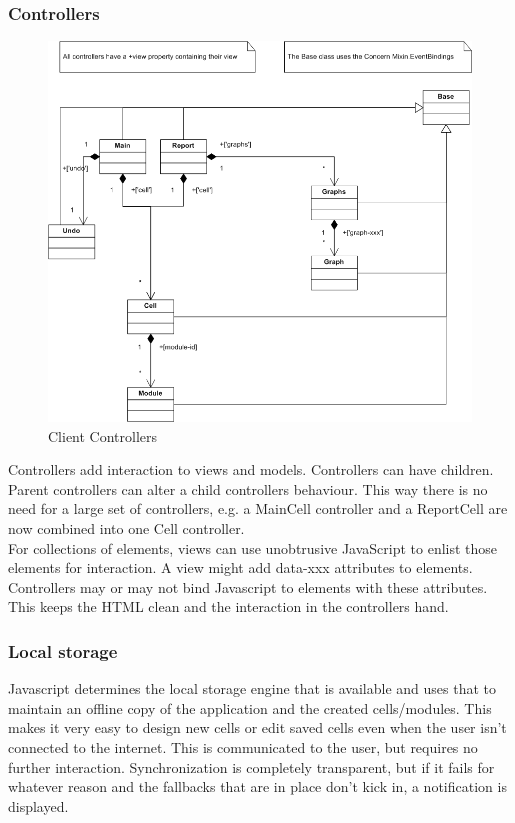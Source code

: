 \documentclass{report}
\begin{document}
				\subsubsection{Controllers}
					\begin{figure}[htb]
						\begin{center}
							\includegraphics[width=\linewidth]{controllers.png}
							\caption{Client Controllers}
							\label{fig: cmodels}
						\end{center}
					\end{figure}	
					Controllers add interaction to views and models. Controllers can have children. Parent controllers can alter a child controllers behaviour. This way there is no need for a large set of controllers, e.g. a MainCell controller and a ReportCell are now combined into one Cell controller. \\
					For collections of elements, views can use unobtrusive JavaScript to enlist those elements for interaction. A view might add data-xxx attributes to elements. Controllers may or may not bind Javascript to elements with these attributes. This keeps the HTML clean and the interaction in the controllers hand. 
					
				\subsubsection{Local storage}
					Javascript determines the local storage engine that is available and uses that to maintain an offline copy of the application and the created cells/modules. This makes it very easy to design new cells or edit saved cells even when the user isn't connected to the internet. This is communicated to the user, but requires no further interaction. Synchronization is completely transparent, but if it fails for whatever reason and the fallbacks that are in place don't kick in, a notification is displayed.
		
\end{document}

